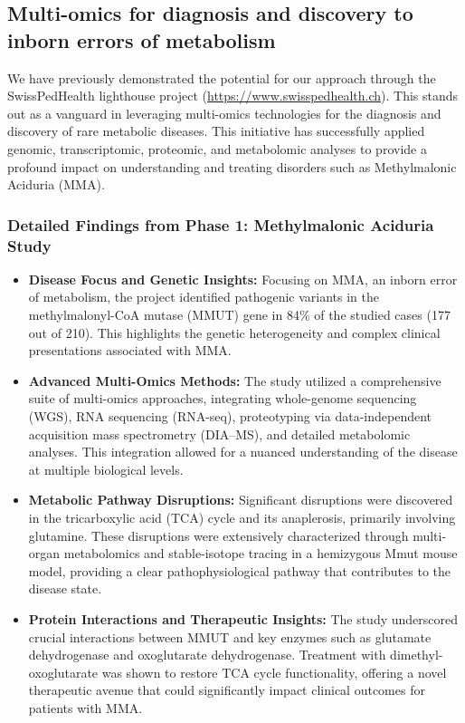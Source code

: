 \subsection{Multi-omics for diagnosis and discovery to inborn errors of metabolism}

We have previously demonstrated the potential for our approach through the SwissPedHealth lighthouse project (\url{https://www.swisspedhealth.ch}).
This stands out as a vanguard in leveraging multi-omics technologies for the diagnosis and discovery of rare metabolic diseases. 
This initiative has successfully applied genomic, transcriptomic, proteomic, and metabolomic analyses to provide a profound impact on understanding and treating disorders such as Methylmalonic Aciduria (MMA).

\subsubsection*{Detailed Findings from Phase 1: Methylmalonic Aciduria Study}
\begin{itemize}
    \item \textbf{Disease Focus and Genetic Insights:} Focusing on MMA, an inborn error of metabolism, the project identified pathogenic variants in the methylmalonyl-CoA mutase (MMUT) gene in 84\% of the studied cases (177 out of 210). This highlights the genetic heterogeneity and complex clinical presentations associated with MMA.
    \item \textbf{Advanced Multi-Omics Methods:} The study utilized a comprehensive suite of multi-omics approaches, integrating whole-genome sequencing (WGS), RNA sequencing (RNA-seq), proteotyping via data-independent acquisition mass spectrometry (DIA–MS), and detailed metabolomic analyses. This integration allowed for a nuanced understanding of the disease at multiple biological levels.
    \item \textbf{Metabolic Pathway Disruptions:} Significant disruptions were discovered in the tricarboxylic acid (TCA) cycle and its anaplerosis, primarily involving glutamine. These disruptions were extensively characterized through multi-organ metabolomics and stable-isotope tracing in a hemizygous Mmut mouse model, providing a clear pathophysiological pathway that contributes to the disease state.
    \item \textbf{Protein Interactions and Therapeutic Insights:} The study underscored crucial interactions between MMUT and key enzymes such as glutamate dehydrogenase and oxoglutarate dehydrogenase. Treatment with dimethyl-oxoglutarate was shown to restore TCA cycle functionality, offering a novel therapeutic avenue that could significantly impact clinical outcomes for patients with MMA.
\end{itemize}

